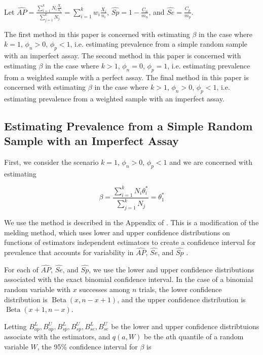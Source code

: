 \documentclass[AMA,STIX1COL]{WileyNJD-v2}
\begin{document}
Let \( \hat{AP} = \frac{\sum_{i=1}^k N_i \frac{X_i}{n_i}}{\sum_{j=1}^k N_j} = \sum_{i=1}^k w_i \frac{X_i}{n_i} \), \( \widehat{Sp} = 1 - \frac{C_n}{m_n} \), and \( \widehat{Se} = \frac{C_p}{m_p} \).

The first method in this paper is concerned with estimating \( \beta \) in the case where \( k = 1 \), \( \phi_n > 0 \), \( \phi_p < 1 \), i.e. estimating prevalence from a simple random sample with an imperfect assay.
The second method in this paper is concerned with estimating \( \beta \) in the case where \( k > 1 \), \( \phi_n = 0 \), \( \phi_p = 1 \), i.e. estimating prevalence from a weighted sample with a perfect assay.
The final method in this paper is concerned with estimating \( \beta \) in the case where \( k > 1 \), \( \phi_n > 0 \), \( \phi_p < 1 \), i.e. estimating prevalence from a weighted sample with an imperfect assay.

\subsection{Estimating Prevalence from a Simple Random Sample with an Imperfect Assay}

First, we consider the scenario \( k = 1 \), \( \phi_n > 0 \), \( \phi_p < 1 \) and we are concerned with estimating 

\begin{equation}
    \beta = \frac{\sum_{i=1}^k N_i \theta_i^*}{\sum_{j=1}^k N_j} = \theta_1^*
\end{equation}

We use the method is described in the Appendix of \cite{Kali:2021}.
This is a modification of the melding method, which uses lower and upper confidence distributions on functions of estimators independent estimators to create a confidence interval for prevalence that accounts for variability in \( \widehat{AP} \), \( \widehat{Se} \), and \( \widehat{Sp} \) \cite{FayP:2015}.

For each of \( \widehat{AP} \), \( \widehat{Se} \), and \( \widehat{Sp} \), we use the lower and upper confidence distributions associated with the exact binomial confidence interval.
In the case of a binomial random variable with \( x \) successes among \( n \) trials, the lower confidence distribution is \( \operatorname{Beta}(x, n - x + 1) \), and the upper confidence distribution is \( \operatorname{Beta}(x + 1, n - x) \).

Letting \( B_{ap}^L, B_{ap}^U, B_{sp}^L, B_{sp}^U, B_{se}^L, B_{se}^U \) be the lower and upper confidence distribtuions associate with the estimators, and \( q(a, W) \) be the \( a \)th quantile of a random variable \( W \), the 95\% confidence interval for \( \beta \) is 
\end{document}
